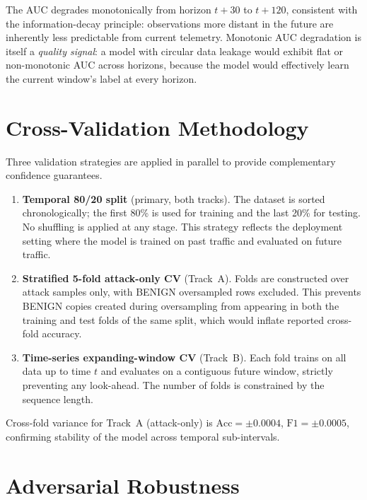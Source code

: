 The AUC degrades monotonically from horizon $t{+}30$ to $t{+}120$,
consistent with the information-decay principle: observations more distant
in the future are inherently less predictable from current telemetry.
Monotonic AUC degradation is itself a \emph{quality signal}: a model
with circular data leakage would exhibit flat or non-monotonic AUC across
horizons, because the model would effectively learn the current window's
label at every horizon.

\section{Cross-Validation Methodology}
\label{sec:cv}

Three validation strategies are applied in parallel to provide
complementary confidence guarantees.

\begin{enumerate}
  \item \textbf{Temporal 80/20 split} (primary, both tracks).
        The dataset is sorted chronologically; the first 80\% is used
        for training and the last 20\% for testing. No shuffling is
        applied at any stage. This strategy reflects the deployment
        setting where the model is trained on past traffic and evaluated
        on future traffic.

  \item \textbf{Stratified 5-fold attack-only CV} (Track~A).
        Folds are constructed over attack samples only, with BENIGN
        oversampled rows excluded. This prevents BENIGN copies created
        during oversampling from appearing in both the training and
        test folds of the same split, which would inflate reported
        cross-fold accuracy.

  \item \textbf{Time-series expanding-window CV} (Track~B).
        Each fold trains on all data up to time $t$ and evaluates on
        a contiguous future window, strictly preventing any look-ahead.
        The number of folds is constrained by the sequence length.
\end{enumerate}

Cross-fold variance for Track~A (attack-only) is
$\text{Acc} = \pm 0.0004$, $\text{F1} = \pm 0.0005$, confirming
stability of the model across temporal sub-intervals.

\section{Adversarial Robustness}
\label{sec:adv}

